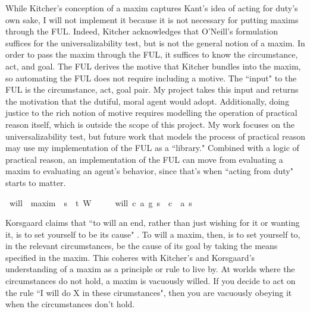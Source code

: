 \begin{isabellebody}
\begin{isamarkuptext}
While Kitcher's conception of a maxim captures Kant's idea of acting for duty's own sake, I will not implement it 
because it is not necessary for putting maxims through the FUL. Indeed, Kitcher acknowledges that 
O'Neill's formulation suffices for the universalizability test, but is not the general notion of a maxim.
In order to pass the maxim through the FUL, it suffices to know the circumstance, act, and goal. The FUL
derives the motive that Kitcher bundles into the maxim, so automating the FUL does not require 
including a motive. The ``input" to the FUL is the circumstance, act, goal pair. My project takes 
this input and returns the motivation that the dutiful, moral agent would adopt. Additionally, doing
justice to the rich notion of motive requires modelling the operation of practical reason itself, 
which is outside the scope of this project. My work focuses on the universalizability test, but future work that 
models the process of practical reason may use my implementation of the FUL as a ``library." Combined 
with a logic of practical reason, an implementation of the FUL can move from evaluating a maxim to 
evaluating an agent's behavior, since that's when ``acting from duty" starts to matter.%
\end{isamarkuptext}\isamarkuptrue%
\isamarkupfalse%
\ will\ {\isacharcolon}{\isacharcolon}\ {\isachardoublequoteopen}maxim\ {\isasymRightarrow}\ s{\isasymRightarrow}\ \ t{\isachardoublequoteclose}\ {\isacharparenleft}{\isachardoublequoteopen}W\ {\isacharunderscore}\ {\isacharunderscore}{\isachardoublequoteclose}{\isacharparenright}\isanewline
\ \ \ {\isachardoublequoteopen}will\ {\isacharparenleft}c{\isacharcomma}\ a{\isacharcomma}\ g{\isacharparenright}\ s\ {\isacharequal}\ {\isacharparenleft}c\ \isactrlbold {\isasymrightarrow}\ {\isacharparenleft}a\ s{\isacharparenright}{\isacharparenright}{\isachardoublequoteclose}\isanewline
{}\isamarkupfalse%
%
\begin{isamarkuptext}%
Korsgaard claims that ``to will an end, rather than just
wishing for it or wanting it, is to set yourself to be its cause" \cite{sources}. To will a maxim, then, 
is to set yourself to, in the relevant circumstances, be the cause of its goal by taking the means 
specified in the maxim. This coheres with 
Kitcher's and Korsgaard's understanding of a maxim as a principle or rule to live by. At worlds 
where the circumstances do not hold, a maxim is vacuously willed. If you decide to act on the rule ``I will 
do X in these cirumstances", then you are vacuously obeying it when the circumstances don't hold.  


\end{isamarkuptext}
\end{isabellebody}
